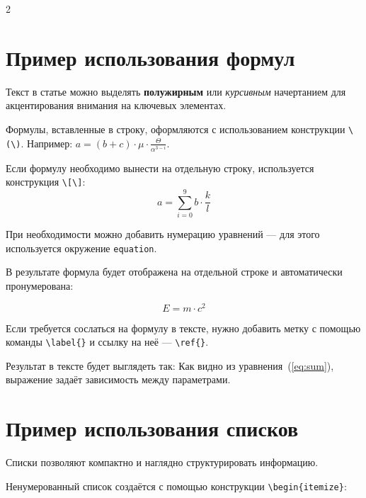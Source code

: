 \documentclass[a4paper,10pt,twoside]{article}
\begin{document}
\begin{multicols}{2}

\section{Пример использования формул}
Текст в статье можно выделять \textbf{полужирным} или \textit{курсивным} начертанием для акцентирования внимания на ключевых элементах.

Формулы, вставленные в строку, оформляются с использованием конструкции \verb|\(\)|. Например:
\(\displaystyle a = (b + c)\cdot\mu\cdot\frac{\Theta}{\alpha^{3-i}}\).

Если формулу необходимо вынести на отдельную строку, используется конструкция \verb|\[\]|:
\[
a = \sum^9_{i=0}b\cdot \frac{k}{l}
\]

При необходимости можно добавить нумерацию уравнений — для этого используется окружение \verb|equation|.  

В результате формула будет отображена на отдельной строке и автоматически пронумерована:

\begin{equation}
E = m \cdot c^2
\label{eq:sum}
\end{equation}

Если требуется сослаться на формулу в тексте, нужно добавить метку с помощью команды \verb|\label{}| и ссылку на неё — \verb|\ref{}|.  

Результат в тексте будет выглядеть так:  
Как видно из уравнения~(\ref{eq:sum}), выражение задаёт зависимость между параметрами.

\section{Пример использования списков}
Списки позволяют компактно и наглядно структурировать информацию.

Ненумерованный список создаётся с помощью конструкции \verb|\begin{itemize}|:


\end{multicols}
\end{document}
